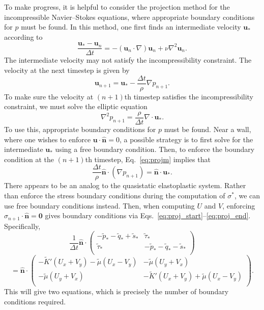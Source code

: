 \documentclass[12pt]{article}
\newcommand{\KT}{\tilde{K}}
\newcommand{\pT}{\tilde{p}}
\newcommand{\sT}{\tilde{s}}
\newcommand{\qT}{\tilde{q}}
\newcommand{\tauT}{\tilde{\tau}}
\newcommand{\muT}{\tilde{\mu}}
\renewcommand{\vec}[1]{\mathbf{#1}}
\newcommand{\vus}{\vec{u}_*}
\begin{document}
To make progress, it is helpful to consider the projection method for the
incompressible Navier--Stokes equations, where appropriate boundary conditions
for $p$ must be found. In this method, one first finds an intermediate velocity
$\vus$ according to
\begin{equation}
  \frac{\vus-\vec{u}_n}{\Delta t} = - (\vec{u}_n \cdot \nabla) \vec{u}_n + \nu \nabla^2 \vec{u}_n.
\end{equation}
The intermediate velocity may not satisfy the incompressibility constraint.
The velocity at the next timestep is given by
\begin{equation}
  \label{eq:projm}
  \vec{u}_{n+1}= \vus - \frac{\Delta t}{\rho} \nabla p_{n+1}.
\end{equation}
To make sure the velocity at $(n+1)$th timestep satisfies the incompressibility
constraint, we must solve the elliptic equation
\begin{equation}
  \nabla^2 p_{n+1} = \frac{\rho}{\Delta t} \nabla \cdot \vus.
\end{equation}
To use this, appropriate boundary conditions for $p$ must be found. Near a
wall, where one wishes to enforce $\vec{u}\cdot \hat{\vec{n}}=0$, a possible
strategy is to first solve for the intermediate $\vus$ using a free boundary
condition. Then, to enforce the boundary condition at the $(n+1)$th timestep,
Eq.~\ref{eq:projm} implies that
\begin{equation}
\frac{\Delta t}{\rho} \hat{\vec{n}} \cdot (\nabla p_{n+1}) = \hat{\vec{n}} \cdot \vus.
\end{equation}
There appears to be an analog to the quasistatic elastoplastic system. Rather
than enforce the stress boundary conditions during the computation of
$\sigma^*$, we can use free boundary conditions instead. Then, when
computing $U$ and $V$, enforcing $\sigma_{n+1} \cdot \hat{\vec{n}}=\vec{0}$
gives boundary conditions via Eqs.~\ref{eq:proj_start}--\ref{eq:proj_end}.
Specifically,
\[
  \frac{1}{\Delta t} \hat{\vec{n}} \cdot
\left(
\begin{array}{cc}
  -\pT_*-\qT_* + \sT_* & \tauT_* \\
  \tauT_* & -\pT_*-\qT_* -\sT_* \\
\end{array}
\right)
\]
\begin{equation}
  =\hat{\vec{n}} \cdot
\left(
\begin{array}{cc}
  -\KT'(U_x+V_y) - \muT(U_x-V_y) & -\muT(U_y+V_x) \\
  -\muT(U_y+V_x) & -\KT'(U_x+V_y) +\muT(U_x-V_y) \\
\end{array}
\right).
\end{equation}
This will give two equations, which is precisely the number of boundary
conditions required.
\end{document}
